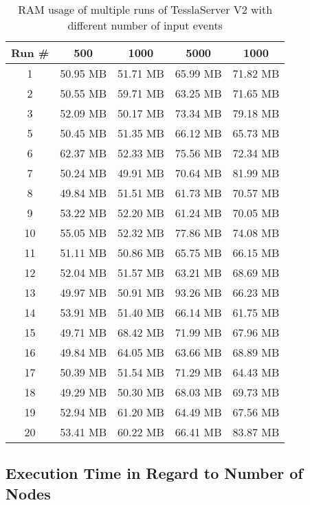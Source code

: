 \begin{table}[!htb]
  \centering
  \caption{RAM usage of multiple runs of TesslaServer V2 with different number of input events}
  \label{table:tessla_server_v2_events_ram_usage_data}
  \begin{tabular}{cllll}
    Run \# & \multicolumn{1}{c}{500} & \multicolumn{1}{c}{1000} & \multicolumn{1}{c}{5000} & \multicolumn{1}{c}{1000}\\ \hline
    1 & 50.95 MB & 51.71 MB & 65.99 MB & 71.82 MB \\
    2 & 50.55 MB & 59.71 MB & 63.25 MB & 71.65 MB \\
    3 & 52.09 MB & 50.17 MB & 73.34 MB & 79.18 MB \\
    5 & 50.45 MB & 51.35 MB & 66.12 MB & 65.73 MB \\
    6 & 62.37 MB & 52.33 MB & 75.56 MB & 72.34 MB \\
    7 & 50.24 MB & 49.91 MB & 70.64 MB & 81.99 MB \\
    8 & 49.84 MB & 51.51 MB & 61.73 MB & 70.57 MB \\
    9 & 53.22 MB & 52.20 MB & 61.24 MB & 70.05 MB \\
    10 &55.05 MB & 52.32 MB & 77.86 MB & 74.08 MB \\
    11 &51.11 MB & 50.86 MB & 65.75 MB & 66.15 MB \\
    12 &52.04 MB & 51.57 MB & 63.21 MB & 68.69 MB \\
    13 &49.97 MB & 50.91 MB & 93.26 MB & 66.23 MB \\
    14 &53.91 MB & 51.40 MB & 66.14 MB & 61.75 MB \\
    15 &49.71 MB & 68.42 MB & 71.99 MB & 67.96 MB \\
    16 &49.84 MB & 64.05 MB & 63.66 MB & 68.89 MB \\
    17 &50.39 MB & 51.54 MB & 71.29 MB & 64.43 MB \\
    18 &49.29 MB & 50.30 MB & 68.03 MB & 69.73 MB \\
    19 &52.94 MB & 61.20 MB & 64.49 MB & 67.56 MB \\
    20 &53.41 MB & 60.22 MB & 66.41 MB & 83.87 MB
  \end{tabular}
\end{table}

\clearpage

\subsection{Execution Time in Regard to Number of Nodes}
\label{sec:appendix:runtime_benchmark_data:execution_time_nodes}

